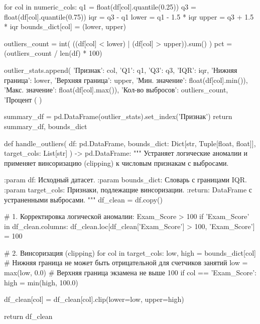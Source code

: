 \documentclass[14pt,a4paper]{extarticle}
\begin{document}
\begin{CodeListing}
    for col in numeric_cols:
        q1 = float(df[col].quantile(0.25))
        q3 = float(df[col].quantile(0.75))
        iqr = q3 - q1
        lower = q1 - 1.5 * iqr
        upper = q3 + 1.5 * iqr
        bounds_dict[col] = (lower, upper)

        outliers_count = int(
            ((df[col] < lower) | (df[col] > upper)).sum()
        )
        pct = (outliers_count / len(df) * 100)

        outlier_stats.append({
            'Признак': col,
            'Q1': q1,
            'Q3': q3,
            'IQR': iqr,
            'Нижняя граница': lower,
            'Верхняя граница': upper,
            'Мин. значение': float(df[col].min()),
            'Макс. значение': float(df[col].max()),
            'Кол-во выбросов': outliers_count,
            'Процент (%
        })

    summary_df = pd.DataFrame(outlier_stats).set_index('Признак')
    return summary_df, bounds_dict


def handle_outliers(
    df: pd.DataFrame,
    bounds_dict: Dict[str, Tuple[float, float]],
    target_cols: List[str]
) -> pd.DataFrame:
    """
    Устраняет логические аномалии и применяет винсоризацию (clipping)
    к числовым признакам с выбросами.

    :param df: Исходный датасет.
    :param bounds_dict: Словарь с границами IQR.
    :param target_cols: Признаки, подлежащие винсоризации.
    :return: DataFrame с устраненными выбросами.
    """
    df_clean = df.copy()

    # 1. Корректировка логической аномалии: Exam_Score > 100
    if 'Exam_Score' in df_clean.columns:
        df_clean.loc[df_clean['Exam_Score'] > 100, 'Exam_Score'] = 100

    # 2. Винсоризация (clipping)
    for col in target_cols:
        low, high = bounds_dict[col]
        # Нижняя граница не может быть отрицательной для счетчиков занятий
        low = max(low, 0.0)
        # Верхняя граница экзамена не выше 100
        if col == 'Exam_Score':
            high = min(high, 100.0)

        df_clean[col] = df_clean[col].clip(lower=low, upper=high)

    return df_clean\end{CodeListing}

\clearpage
\end{document}
